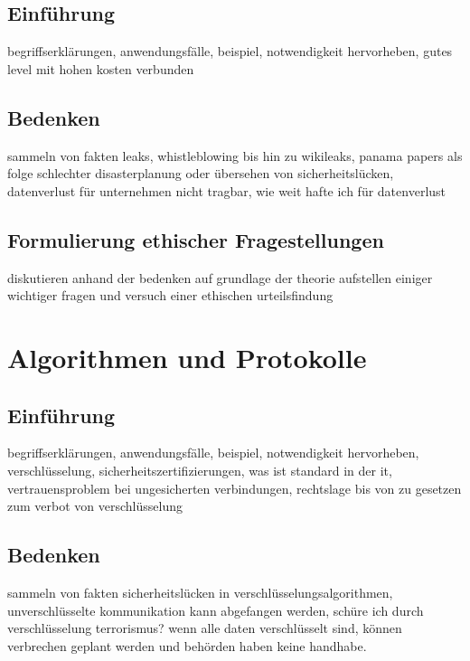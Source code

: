 \documentclass[letterpaper, 12pt]{article}
\let\tempsection\section
\renewcommand\section[1]{\vspace{-0.3cm}\tempsection{#1}\vspace{-0.3cm}}
\let\tempsubsection\subsection
\renewcommand\subsection[1]{\vspace{0cm}\tempsubsection{#1}\vspace{0cm}}
\begin{document}
\subsection{Einführung}

begriffserklärungen, anwendungsfälle, beispiel, notwendigkeit hervorheben, gutes level mit hohen kosten verbunden

\subsection{Bedenken}

sammeln von fakten \newline
leaks, whistleblowing bis hin zu wikileaks, panama papers als folge schlechter disasterplanung oder übersehen von sicherheitslücken, datenverlust für unternehmen nicht tragbar, wie weit hafte ich für datenverlust

\subsection{Formulierung ethischer Fragestellungen}

diskutieren anhand der bedenken auf grundlage der theorie \newline
aufstellen einiger wichtiger fragen und versuch einer ethischen urteilsfindung

\clearpage

\section{Algorithmen und Protokolle}

\subsection{Einführung}

begriffserklärungen, anwendungsfälle, beispiel, notwendigkeit hervorheben, verschlüsselung, sicherheitszertifizierungen, was ist standard in der it, vertrauensproblem bei ungesicherten verbindungen, rechtslage bis von zu gesetzen zum verbot von verschlüsselung

\subsection{Bedenken}

sammeln von fakten \newline
sicherheitslücken in verschlüsselungsalgorithmen, unverschlüsselte kommunikation kann abgefangen werden, schüre ich durch verschlüsselung terrorismus? wenn alle daten verschlüsselt sind, können verbrechen geplant werden und behörden haben keine handhabe.
\end{document}
